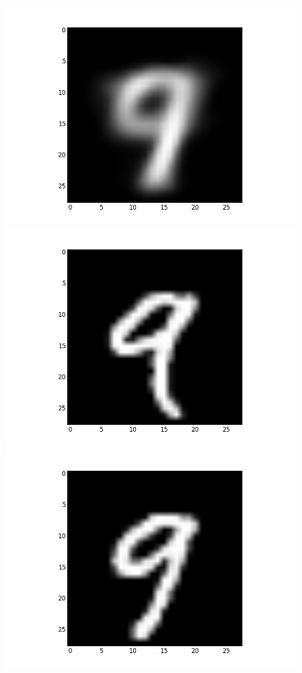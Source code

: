 \documentclass[submit]{harvardml}
\begin{document}
\begin{figure}[ht]
    \centering
    \includegraphics[scale=0.20]{K10-mean-0}
    \includegraphics[scale=0.20]{K10-representative-0-0}
    \includegraphics[scale=0.20]{K10-representative-0-1}

\end{figure}
\end{document}
